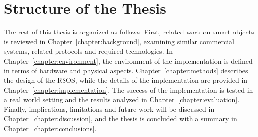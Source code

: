 \section{Structure of the Thesis}
\label{section:structure} 

The rest of this thesis is organized as follows. First, related work on smart objects is reviewed in Chapter~\ref{chapter:background}, examining similar commercial systems, related protocols and required technologies. In Chapter~\ref{chapter:environment}, the environment of the implementation is defined in terms of hardware and physical aspects. Chapter~\ref{chapter:methods} describes the design of the RSOS, while the details of the implementation are provided in Chapter~\ref{chapter:implementation}. The success of the implementation is tested in a real world setting and the results analyzed in Chapter~\ref{chapter:evaluation}. Finally, implications, limitations and future work will be discussed in Chapter~\ref{chapter:discussion}, and the thesis is concluded with a summary in Chapter~\ref{chapter:conclusions}.


